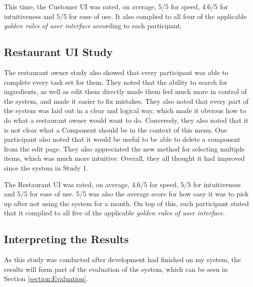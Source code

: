 This time, the Customer UI was rated, on average, 5/5 for speed, 4.6/5 for intuitiveness and 5/5 for ease of use. It also complied to all four of the applicable \textit{golden rules of user interface} according to each participant. 

\subsection{Restaurant UI Study}

The restaurant owner study also showed that every participant was able to complete every task set for them. They noted that the ability to search for ingredients, as well as edit them directly made them feel much more in control of the system, and made it easier to fix mistakes. They also noted that every part of the system was laid out in a clear and logical way, which made it obvious how to do what a restaurant owner would want to do. Conversely, they also noted that it is not clear what a Component should be in the context of this menu. One participant also noted that it would be useful to be able to delete a component from the edit page. They also appreciated the new method for selecting multiple items, which was much more intuitive. Overall, they all thought it had improved since the system in Study 1.

The Restaurant UI was rated, on average, 4.6/5 for speed, 5/5 for intuitiveness and 5/5 for ease of use. 5/5 was also the average score for how easy it was to pick up after not using the system for a month. On top of this, each participant stated that it complied to all five of the applicable \textit{golden rules of user interface}.

\subsection{Interpreting the Results}

As this study was conducted after development had finished on my system, the results will form part of the evaluation of the system, which can be seen in Section \ref{section:Evaluation}.

